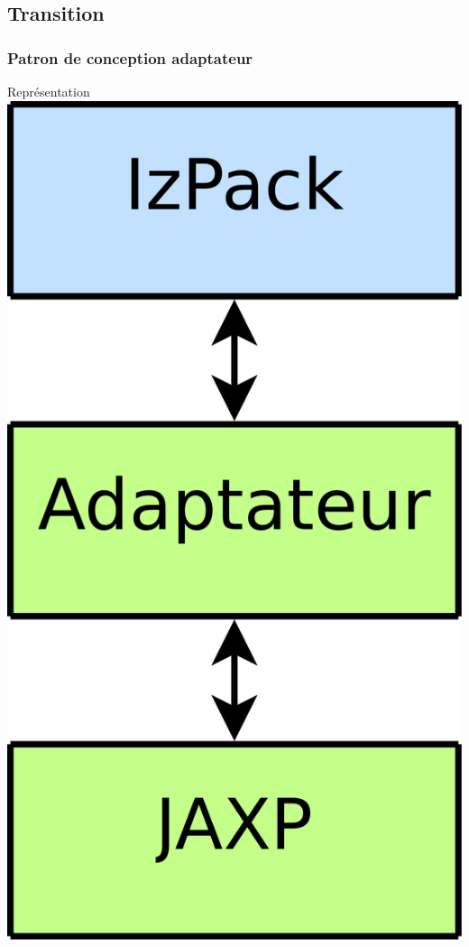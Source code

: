 \subsection{Transition}
\begin{frame}
\frametitle{Patron de conception adaptateur}

\begin{minipage}[c]{.3\linewidth}
\begin{beamerboxesrounded}[shadow=true]{Représentation}
	\centering
	\includegraphics[width=.8\linewidth]{../image/avecAdaptateur.png}
\end{beamerboxesrounded}
\end{minipage}
\hfill
\begin{minipage}[c]{.6\linewidth}
\begin{minipage}[c]{\linewidth}

\end{minipage}
\end{minipage}
\end{frame}
